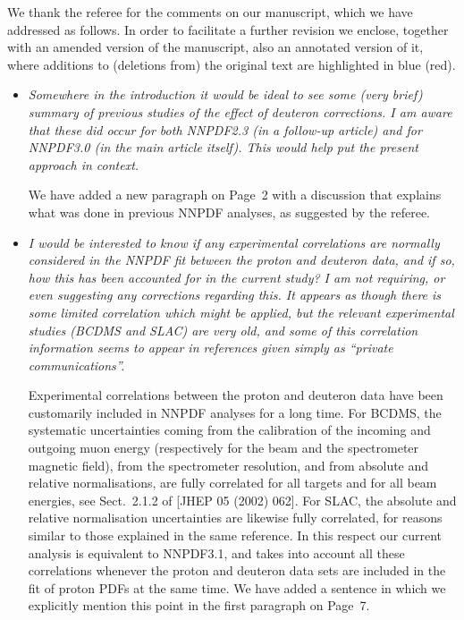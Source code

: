 \documentclass[a4paper,11pt]{article}
\begin{document}
\noindent We thank the referee for the comments on our manuscript,
which we have addressed as follows. In order to facilitate a further revision
we enclose, together with an amended version of the manuscript, also an
annotated version of it, where additions to (deletions from) the original text
are highlighted in blue (red).

\begin{itemize}

\item {\it Somewhere in the introduction it would be ideal to see some (very
  brief) summary of previous studies of the effect of deuteron corrections.
  I am aware that these did occur for both NNPDF2.3 (in a follow-up article)
  and for NNPDF3.0 (in the main article itself). This would help put the
  present approach in context.}

  We have added a new paragraph on Page~2 with a discussion that explains
  what was done in previous NNPDF analyses, as suggested by the referee.

\item {\it I would be interested to know if any experimental correlations are
  normally considered in the NNPDF fit between the proton and deuteron data,
  and if so, how this has been accounted for in the current study? I am not
  requiring, or even suggesting any corrections regarding this. It appears as
  though there is some limited correlation which might be applied, but the
  relevant experimental studies (BCDMS and SLAC) are very old, and some of
  this correlation information seems to appear in references given
  simply as ``private communications''.}

  Experimental correlations between the proton and deuteron data have been
  customarily included in NNPDF analyses for a long time. For BCDMS, the
  systematic uncertainties coming from the calibration of the incoming
  and outgoing muon energy (respectively for the beam and the spectrometer
  magnetic field), from the spectrometer resolution, and from absolute and
  relative normalisations, are fully correlated for all targets and for all
  beam energies, see Sect.~2.1.2 of [JHEP 05 (2002) 062]. For SLAC, the
  absolute and relative normalisation uncertainties are likewise fully
  correlated, for reasons similar to those explained in the same reference.
  In this respect our current analysis is equivalent to NNPDF3.1, and takes
  into account all these correlations whenever the proton and deuteron data
  sets are included in the fit of proton PDFs at the same time. We have added a
  sentence in which we explicitly mention this point in the first paragraph on
  Page~7.


\end{itemize}
\end{document}
